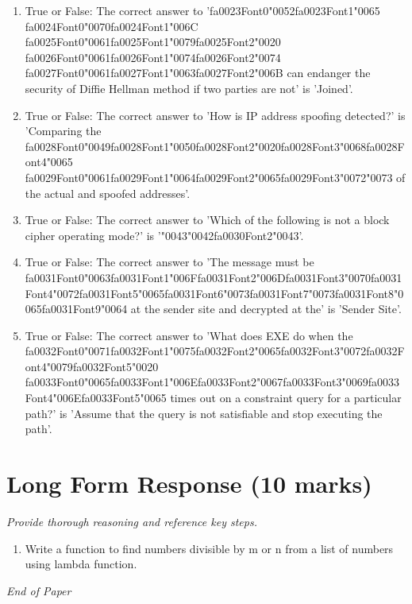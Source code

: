 \documentclass[12pt]{article}
\begin{document}
\begin{enumerate}[label=\arabic*.]
\item True or False: The correct answer to '{\csname fa0023Font0\endcsname\char"0052}{\csname fa0023Font1\endcsname\char"0065} {\csname fa0024Font0\endcsname\char"0070}{\csname fa0024Font1\endcsname\char"006C} {\csname fa0025Font0\endcsname\char"0061}{\csname fa0025Font1\endcsname\char"0079}{\csname fa0025Font2\endcsname\char"0020} {\csname fa0026Font0\endcsname\char"0061}{\csname fa0026Font1\endcsname\char"0074}{\csname fa0026Font2\endcsname\char"0074} {\csname fa0027Font0\endcsname\char"0061}{\csname fa0027Font1\endcsname\char"0063}{\csname fa0027Font2\endcsname\char"006B} can endanger the security of Diffie Hellman method if two parties are not' is 'Joined'.
\item True or False: The correct answer to 'How is IP address spoofing detected?' is 'Comparing the {\csname fa0028Font0\endcsname\char"0049}{\csname fa0028Font1\endcsname\char"0050}{\csname fa0028Font2\endcsname\char"0020}{\csname fa0028Font3\endcsname\char"0068}{\csname fa0028Font4\endcsname\char"0065} {\csname fa0029Font0\endcsname\char"0061}{\csname fa0029Font1\endcsname\char"0064}{\csname fa0029Font2\endcsname\char"0065}{\csname fa0029Font3\endcsname\char"0072}{\char"0073} of the actual and spoofed addresses'.
\item True or False: The correct answer to 'Which of the following is not a block cipher operating mode?' is '{\char"0043}{\char"0042}{\csname fa0030Font2\endcsname\char"0043}'.
\item True or False: The correct answer to 'The message must be {\csname fa0031Font0\endcsname\char"0063}{\csname fa0031Font1\endcsname\char"006F}{\csname fa0031Font2\endcsname\char"006D}{\csname fa0031Font3\endcsname\char"0070}{\csname fa0031Font4\endcsname\char"0072}{\csname fa0031Font5\endcsname\char"0065}{\csname fa0031Font6\endcsname\char"0073}{\csname fa0031Font7\endcsname\char"0073}{\csname fa0031Font8\endcsname\char"0065}{\csname fa0031Font9\endcsname\char"0064} at the sender site and decrypted at the' is 'Sender Site'.
\item True or False: The correct answer to 'What does EXE do when the {\csname fa0032Font0\endcsname\char"0071}{\csname fa0032Font1\endcsname\char"0075}{\csname fa0032Font2\endcsname\char"0065}{\csname fa0032Font3\endcsname\char"0072}{\csname fa0032Font4\endcsname\char"0079}{\csname fa0032Font5\endcsname\char"0020} {\csname fa0033Font0\endcsname\char"0065}{\csname fa0033Font1\endcsname\char"006E}{\csname fa0033Font2\endcsname\char"0067}{\csname fa0033Font3\endcsname\char"0069}{\csname fa0033Font4\endcsname\char"006E}{\csname fa0033Font5\endcsname\char"0065} times out on a constraint query for a particular path?' is 'Assume that the query is not satisfiable and stop executing the path'.
\end{enumerate}

\section*{Long Form Response (10 marks)}
\textit{Provide thorough reasoning and reference key steps.}
\begin{enumerate}[label=\arabic*.]
\item Write a function to find numbers divisible by m or n from a list of numbers using lambda
function.
\end{enumerate}

\vfill
\noindent\textit{End of Paper}
\end{document}
